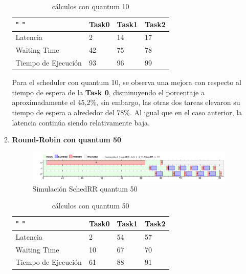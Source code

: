 \documentclass[11pt]{article}
\begin{document}
\begin{enumerate}
\begin{enumerate}
  \begin{table}[htb]
  \centering
  \begin{tabular}{| l | l | l | l |}
  \hline
  " " & Task0 & Task1 & Task2 \\
  \hline \hline
  Latencia & 2 & 14 & 17 \\ \hline
  Waiting Time & 42 & 75 & 78 \\ \hline
  Tiempo de Ejecución & 93 & 96 & 99 \\ \hline
  \end{tabular}
  \caption{cálculos con quantum 10}
  \end{table}

  Para el scheduler con quantum 10, se observa una mejora con respecto al tiempo de espera de la \textbf{Task 0}, disminuyendo el porcentaje a aproximadamente el 45,2\%, sin embargo, las otras dos tareas elevaron su tiempo de espera a alrededor del 78\%. Al igual que en el caso anterior, la latencia continúa siendo relativamente baja.

  \item \textbf{Round-Robin con quantum 50}

        \begin{figure}[H]
          \includegraphics[scale=0.5]{Ej5q50}
          \caption{Simulación SchedRR quantum 50}
        \end{figure}

  \begin{table}[htb]
  \centering
  \begin{tabular}{| l | l | l | l |}
  \hline
  " " & Task0 & Task1 & Task2 \\
  \hline \hline
  Latencia & 2 & 54 & 57 \\ \hline
  Waiting Time & 10 & 67 & 70 \\ \hline
  Tiempo de Ejecución & 61 & 88 & 91 \\ \hline
  \end{tabular}
  \caption{cálculos con quantum 50}
  \end{table}


\end{enumerate}
\end{enumerate}
\end{document}
